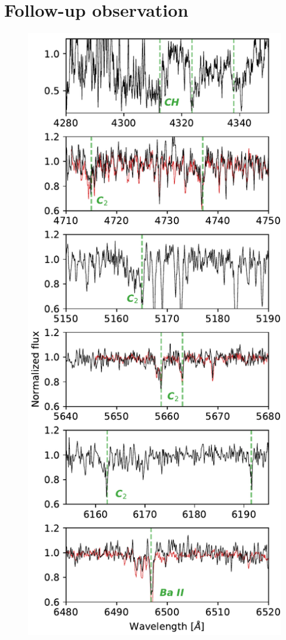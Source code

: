 \section{Follow-up observation}
\label{sec:asiago}

\begin{figure}
	\centering
	\includegraphics[width=\columnwidth]{asiago_cemp2.pdf}

\end{figure}

